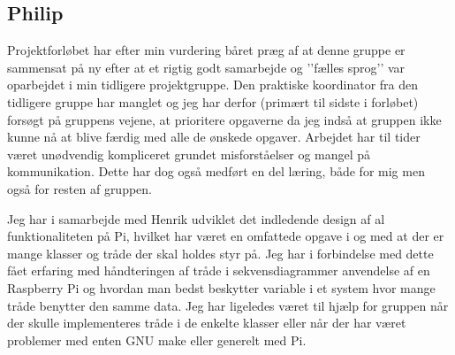 \subsection{Philip}

Projektforløbet har efter min vurdering båret præg af at denne gruppe er sammensat på ny efter at et rigtig godt samarbejde og ’’fælles sprog’’ var oparbejdet i min tidligere projektgruppe. Den praktiske koordinator fra den tidligere gruppe har manglet og jeg har derfor (primært til sidste i forløbet) forsøgt på gruppens vejene, at prioritere opgaverne da jeg indså at gruppen ikke kunne nå at blive færdig med alle de ønskede opgaver. Arbejdet har til tider været unødvendig kompliceret grundet misforståelser og mangel på kommunikation. Dette har dog også medført en del læring, både for mig men også for resten af gruppen.

Jeg har i samarbejde med Henrik udviklet det indledende design af al funktionaliteten på Pi, hvilket har været en omfattede opgave i og med at der er mange klasser og tråde der skal holdes styr på. Jeg har i forbindelse med dette fået erfaring med håndteringen af tråde i sekvensdiagrammer anvendelse af en Raspberry Pi og hvordan man bedst beskytter variable i et system hvor mange tråde benytter den samme data. Jeg har ligeledes været til hjælp for gruppen når der skulle implementeres tråde i de enkelte klasser eller når der har været problemer med enten GNU make eller generelt med Pi.
